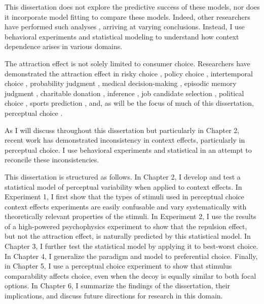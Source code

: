 This dissertation does not explore the predictive success of these models, nor does it incorporate model fitting to compare these models. Indeed, other researchers have performed such analyses \parencite{turnerCompetingTheoriesMultialternative2018a,cataldoModelingPreferenceReversals2021,evansResponsetimeDataProvide2019b,molloyWhatResponseTime2019a,berkowitschRigorouslyTestingMultialternative2014b,hotalingTheoreticalDevelopmentsDecision2010,cohen2017multi}, arriving at varying conclusions. Instead, I use behavioral experiments and statistical modeling to understand how context dependence arises in various domains.

The attraction effect is not solely limited to consumer choice. Researchers have demonstrated the attraction effect in risky choice \parencite{mohr2017attraction}, policy choice \parencite{herneDecoyAlternativesPolicy1997b}, intertemporal choice \parencite{mariniAttractionComesMany2020}, probability judgment \parencite{caiWhenAlternativeHypotheses2023}, medical decision-making \parencite{schwartz1999more}, episodic memory judgment \parencite{maylorSimilarityAttractionEffects2007b}, charitable donation \parencite{pittarello2020three},  inference \parencite{truebloodMultialternativeContextEffects2012}, job candidate selection \parencite{highhouseContextDependentSelectionEffects1996}, political choice \parencite{pan1995attractiovoting}, sports prediction \parencite{fang2024context}, and, as will be the focus of much of this dissertation, perceptual choice \parencite{evansImpactPresentationOrder2021,trueblood2013not, trueblood2015fragile, spektorRepulsionEffectPreferential2022,spektorWhenGoodLooks2018b,yearsleyContextEffectsSimilarity2022,turnerCompetingTheoriesMultialternative2018a,liaoInfluenceDistanceDecoy2021}. 

As I will discuss throughout this dissertation but particularly in Chapter 2, recent work has demonstrated inconsistency in context effects, particularly in perceptual choice. I use behavioral experiments and statistical in an attempt to reconcile these inconsistencies.

This dissertation is structured as follows. In Chapter 2, I develop and test a statistical model of perceptual variability when applied to context effects. In Experiment 1, I first show that the types of stimuli used in perceptual choice context effects experiments are easily confusable and vary systematically with theoretically relevant properties of the stimuli. In Experiment 2, I use the results of a high-powered psychophysics experiment to show that the repulsion effect, but not the attraction effect, is naturally predicted by this statistical model. In Chapter 3, I further test the statistical model by applying it to best-worst choice. In Chapter 4, I generalize the paradigm and model to preferential choice. Finally, in Chapter 5, I use a perceptual choice experiment to show that stimulus comparability affects choice, even when the decoy is equally similar to both focal options. In Chapter 6, I summarize the findings of the dissertation, their implications, and discuss future directions for research in this domain. 
